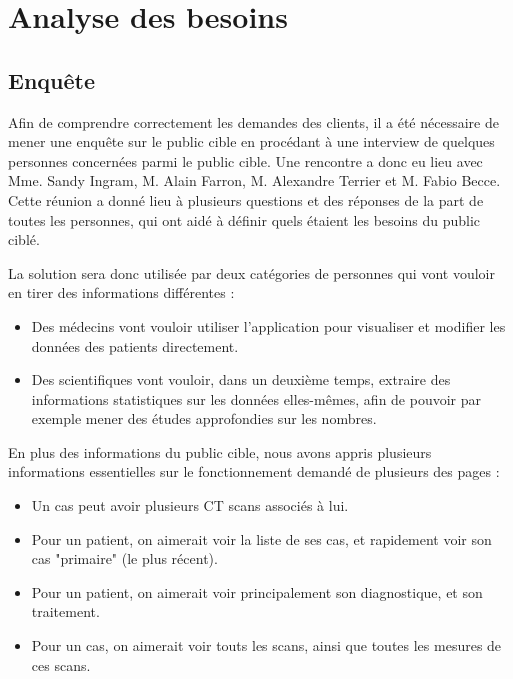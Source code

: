 
\section{Analyse des besoins}

	\subsection{Enquête}

	Afin de comprendre correctement les demandes des clients, il a été nécessaire de mener une enquête sur le public cible en procédant à une interview de quelques personnes concernées parmi le public cible. Une rencontre a donc eu lieu avec Mme. Sandy Ingram, M. Alain Farron, M. Alexandre Terrier et M. Fabio Becce. Cette réunion a donné lieu à plusieurs questions et des réponses de la part de toutes les personnes, qui ont aidé à définir quels étaient les besoins du public ciblé.

	La solution sera donc utilisée par deux catégories de personnes qui vont vouloir
	en tirer des informations différentes :

	\begin{itemize}
		\item Des médecins vont vouloir utiliser l'application pour visualiser
		et modifier les données des patients directement.
		\item Des scientifiques vont vouloir, dans un deuxième temps,
		extraire des informations statistiques sur les données elles-mêmes,
		afin de pouvoir par exemple mener des études approfondies sur les nombres.
	\end{itemize}

	En plus des informations du public cible, nous avons appris plusieurs informations essentielles sur le fonctionnement demandé de plusieurs des pages :

	\begin{itemize}
		\item Un cas peut avoir plusieurs CT scans associés à lui.
		\item Pour un patient, on aimerait voir la liste de ses cas, et rapidement voir son cas "primaire" (le plus récent).
		\item Pour un patient, on aimerait voir principalement son diagnostique, et son traitement.
		\item Pour un cas, on aimerait voir touts les scans, ainsi que toutes les mesures de ces scans.
	\end{itemize}

